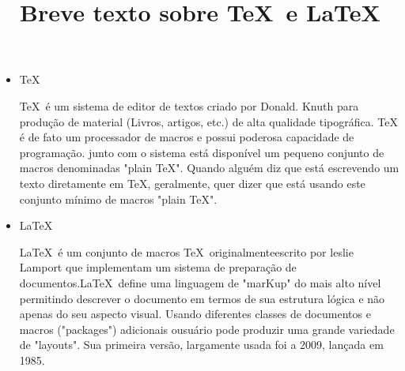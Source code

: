 \documentclass[12pt]{memoir}
\begin{document}
	
\title{	Breve texto sobre \TeX\ e \LaTeX}
\maketitle

\begin{itemize}	
\item   \TeX  

 \TeX\ é um sistema de editor de textos criado por Donald. Knuth para produção de material (Livros, artigos, etc.) de alta qualidade tipográfica. \TeX{} é de fato um processador de macros e possui poderosa capacidade de programação. junto com o sistema está disponível um pequeno conjunto de macros denominadas "plain \TeX ". Quando alguém diz que está escrevendo um texto diretamente em \TeX, geralmente, quer dizer que está usando este conjunto mínimo de macros "plain \TeX ".

\item  \LaTeX 

\LaTeX\ é um conjunto de macros \TeX\  originalmenteescrito por leslie Lamport que implementam um sistema de preparação de documentos.\LaTeX\ define uma linguagem de "marKup" do mais alto nível permitindo descrever o documento em termos de sua estrutura lógica e não apenas do seu aspecto visual. Usando diferentes classes de documentos e macros ("packages") adicionais ousuário pode produzir uma grande variedade de "layouts". Sua primeira versão, largamente usada foi a 2009, lançada em 1985.


\end{itemize}	
	
	
\end{document}
